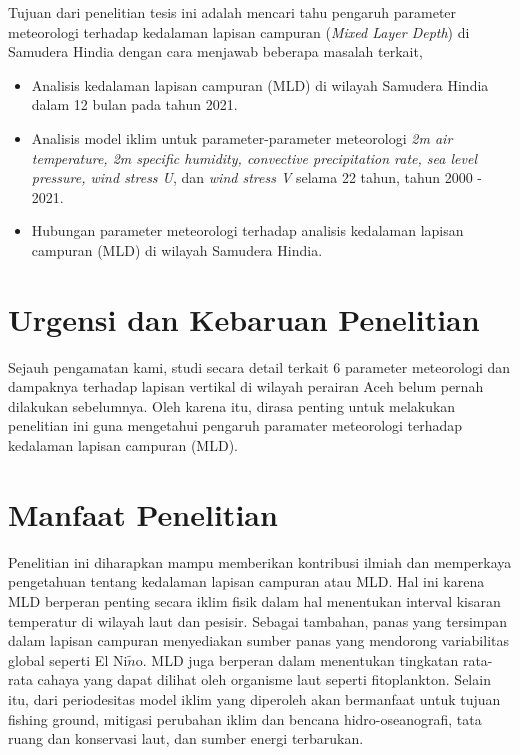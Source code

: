 \begin{spacing}{1.5}
	Tujuan dari penelitian tesis ini adalah mencari tahu pengaruh parameter meteorologi terhadap kedalaman lapisan campuran (\textit{Mixed Layer Depth}) di Samudera Hindia dengan cara menjawab beberapa masalah terkait,
	
	\begin{itemize}
		\item Analisis kedalaman lapisan campuran (MLD) di wilayah Samudera Hindia dalam 12 bulan pada tahun 2021.
		\item Analisis model iklim untuk parameter-parameter meteorologi \textit{2m air temperature, 2m specific humidity, convective precipitation rate, sea level pressure, wind stress U}, dan \textit{wind stress V} selama 22 tahun, tahun 2000 - 2021.
		\item Hubungan parameter meteorologi terhadap analisis kedalaman lapisan campuran (MLD) di wilayah Samudera Hindia.
	\end{itemize}
	
	\section[Urgensi dan Kebaruan Penelitian]{Urgensi dan Kebaruan Penelitian}

	Sejauh pengamatan kami, studi secara detail terkait 6 parameter meteorologi dan dampaknya terhadap lapisan vertikal di wilayah perairan Aceh belum pernah dilakukan sebelumnya. Oleh karena itu, dirasa penting untuk melakukan penelitian ini guna mengetahui pengaruh paramater meteorologi terhadap kedalaman lapisan campuran (MLD).

	\section[Manfaat Penelitian]{Manfaat Penelitian}
	
	Penelitian ini diharapkan mampu memberikan kontribusi ilmiah dan memperkaya pengetahuan tentang kedalaman lapisan campuran atau MLD. Hal ini karena MLD berperan penting secara iklim fisik dalam hal menentukan interval kisaran temperatur di wilayah laut dan pesisir. Sebagai tambahan, panas yang tersimpan dalam lapisan campuran menyediakan sumber panas yang mendorong variabilitas global seperti El Ni$\tilde{n}$o. MLD juga berperan dalam menentukan tingkatan rata-rata cahaya yang dapat dilihat oleh organisme laut seperti fitoplankton. Selain itu, dari periodesitas model iklim yang diperoleh akan bermanfaat untuk tujuan fishing ground, mitigasi perubahan iklim dan bencana hidro-oseanografi, tata ruang dan konservasi
	laut, dan sumber energi terbarukan. 


\end{spacing}
